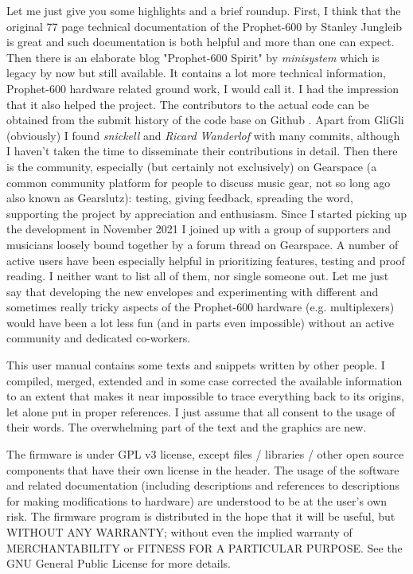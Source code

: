 \documentclass[landscape, 11pt, oneside, twoside]{report}
\newenvironment{flowtext}{\addmargin[0cm]{0cm}}{\endaddmargin} %
\begin{document}
\begin{flowtext}
Let me just give you some highlights and a brief roundup. First, I think that the original 77 page technical documentation of the Prophet-600 by Stanley Jungleib \cite{p600siservicemanual} is great and such  documentation is both helpful and more than one can expect. Then there is an elaborate blog "Prophet-600 Spirit" by \textit{minisystem} \cite{p600spirit} which is legacy by now but still available. It contains a lot more technical information, Prophet-600 hardware related ground work, I would call it. I had the impression that it also helped the project. The contributors to the actual code can be obtained from the submit history of the code base on Github \cite{imogen}. Apart from GliGli (obviously) I found \textit{snickell} and \textit{Ricard Wanderlof} with many commits, although I haven't taken the time to disseminate their contributions in detail. Then there is the community, especially (but certainly not exclusively) on Gearspace (a common community platform for people to discuss music gear, not so long ago also known as Gearslutz): testing, giving feedback, spreading the word, supporting the project by appreciation and enthusiasm. Since I started picking up the development in November 2021 I joined up with a group of supporters and musicians loosely bound together by a forum thread on Gearspace. A number of active users have been especially helpful in prioritizing features, testing and proof reading. I neither want to list all of them, nor single someone out. Let me just say that developing the new envelopes and experimenting with different and sometimes really tricky aspects of the Prophet-600 hardware (e.g. multiplexers) would have been a lot less fun (and in parts even impossible) without an active community and dedicated co-workers.  

This user manual contains some texts and snippets written by other people. I compiled, merged, extended and in some case corrected the available information to an extent that makes it near impossible to trace everything back to its origins, let alone put in proper references. I just assume that all consent to the usage of their words. The overwhelming part of the text and the graphics are new.

The firmware  is under GPL v3 license, except files / libraries / other open source components that have their own license in the header. The usage of the software and related documentation (including descriptions and references to descriptions for making modifications to hardware) are understood to be at the user's own risk. The firmware program is distributed in the hope that it will be useful, but WITHOUT ANY WARRANTY; without even the implied warranty of MERCHANTABILITY or FITNESS FOR A PARTICULAR PURPOSE. See the GNU General Public License for more details.

\end{flowtext}
\end{document}
